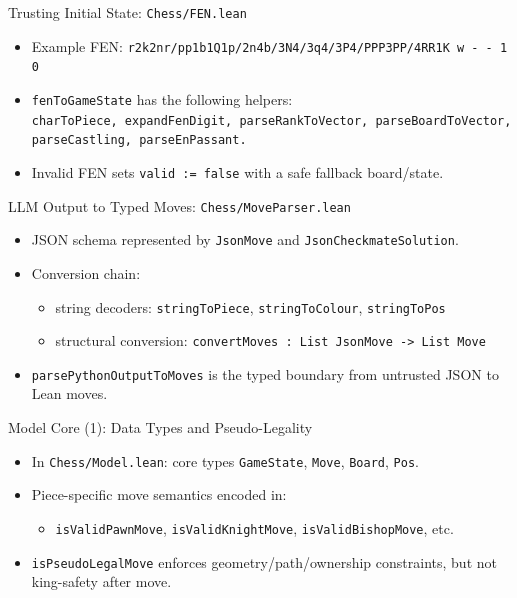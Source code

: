 \documentclass{beamer}
\begin{document}
\begin{frame}{Trusting Initial State: \texttt{Chess/FEN.lean}}
\begin{itemize}
  \item Example FEN: \texttt{r2k2nr/pp1b1Q1p/2n4b/3N4/3q4/3P4/PPP3PP/4RR1K w - - 1 0}
  \item \texttt{fenToGameState} has the following helpers: \\
  \texttt{charToPiece, expandFenDigit, parseRankToVector, parseBoardToVector, parseCastling, parseEnPassant.}
  \item Invalid FEN sets \texttt{valid := false} with a safe fallback board/state.
\end{itemize}
\end{frame}

\begin{frame}{LLM Output to Typed Moves: \texttt{Chess/MoveParser.lean}}
\begin{itemize}
  \item JSON schema represented by \texttt{JsonMove} and \texttt{JsonCheckmateSolution}.
  \item Conversion chain:
  \begin{itemize}
    \item string decoders: \texttt{stringToPiece}, \texttt{stringToColour}, \texttt{stringToPos}
    \item structural conversion: \texttt{convertMoves : List JsonMove -> List Move}
  \end{itemize}
  \item \texttt{parsePythonOutputToMoves} is the typed boundary from untrusted JSON to Lean moves.
\end{itemize}
\end{frame}

\begin{frame}{Model Core (1): Data Types and Pseudo-Legality}
\begin{itemize}
  \item In \texttt{Chess/Model.lean}: core types \texttt{GameState}, \texttt{Move}, \texttt{Board}, \texttt{Pos}.
  \item Piece-specific move semantics encoded in:
  \begin{itemize}
    \item \texttt{isValidPawnMove}, \texttt{isValidKnightMove}, \texttt{isValidBishopMove}, etc.
  \end{itemize}
  \item \texttt{isPseudoLegalMove} enforces geometry/path/ownership constraints,
  but not king-safety after move.
\end{itemize}
\end{frame}
\end{document}

